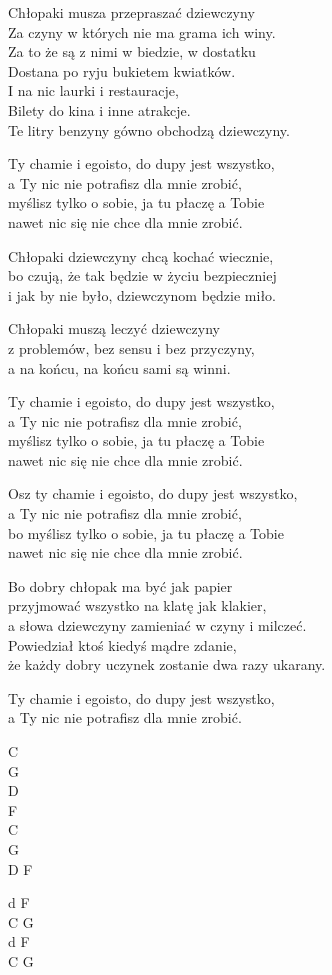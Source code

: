 \begin{text}
    Chłopaki musza przepraszać dziewczyny\\
    Za czyny w których nie ma grama ich winy.\\
    Za to że są z nimi w biedzie, w dostatku\\
    Dostana po ryju bukietem kwiatków.\\
    I na nic laurki i restauracje,\\
    Bilety do kina i inne atrakcje.\\
    Te litry benzyny gówno obchodzą dziewczyny.

    \vin Ty chamie i egoisto, do dupy jest wszystko,\\
    \vin a Ty nic nie potrafisz dla mnie zrobić,\\
    \vin myślisz tylko o sobie, ja tu płaczę a Tobie\\
    \vin nawet nic się nie chce dla mnie zrobić.

    Chłopaki dziewczyny chcą kochać wiecznie,\\
    bo czują, że tak będzie w życiu bezpieczniej\\
    i jak by nie było, dziewczynom będzie miło.

    Chłopaki muszą leczyć dziewczyny\\
    z problemów, bez sensu i bez przyczyny,\\
    a na końcu, na końcu sami są winni.

    \vin Ty chamie i egoisto, do dupy jest wszystko,\\
    \vin a Ty nic nie potrafisz dla mnie zrobić,\\
    \vin myślisz tylko o sobie, ja tu płaczę a Tobie\\
    \vin nawet nic się nie chce dla mnie zrobić.

    \vin Osz ty chamie i egoisto, do dupy jest wszystko,\\
    \vin a Ty nic nie potrafisz dla mnie zrobić,\\
    \vin bo myślisz tylko o sobie, ja tu płaczę a Tobie\\
    \vin nawet nic się nie chce dla mnie zrobić.

    \vin Bo dobry chłopak ma być jak papier\\
    \vin przyjmować wszystko na klatę jak klakier,\\
    \vin a słowa dziewczyny zamieniać w czyny i milczeć.\\
    \vin Powiedział ktoś kiedyś mądre zdanie,\\
    \vin że każdy dobry uczynek zostanie dwa razy ukarany.

    \vin Ty chamie i egoisto, do dupy jest wszystko,\\
    \vin a Ty nic nie potrafisz dla mnie zrobić.
\end{text}
\begin{chord}
    C\\
    G\\
    D\\
    F\\
    C\\
    G\\
    D F

    d F\\
    C G\\
    d F\\
    C G
\end{chord}
